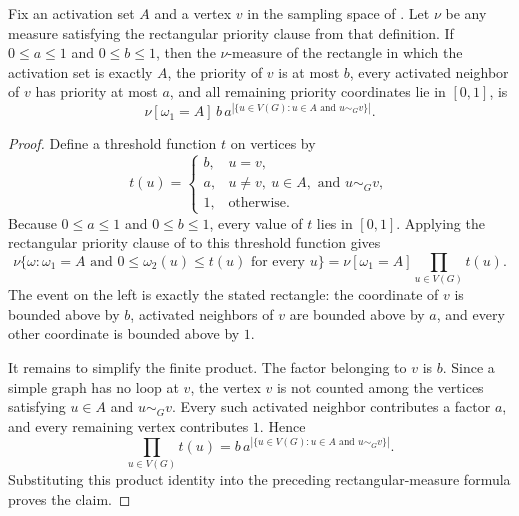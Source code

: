 \begin{helper}
Fix an activation set $A$ and a vertex $v$ in the sampling space of
.  Let $\nu$ be any measure satisfying
the rectangular priority clause from that definition.  If $0\le a\le 1$ and
$0\le b\le 1$, then the $\nu$-measure of the rectangle in which the activation
set is exactly $A$, the priority of $v$ is at most $b$, every activated
neighbor of $v$ has priority at most $a$, and all remaining priority
coordinates lie in $[0,1]$, is
\[
\nu[\omega_1=A]\,
b\,a^{|\{u\in V(G):u\in A\text{ and }u\sim_G v\}|}.
\]
\end{helper}
\begin{proof}
Define a threshold function $t$ on vertices by
\[
t(u)=
\begin{cases}
b, & u=v,\\
a, & u\ne v,\ u\in A,\text{ and }u\sim_G v,\\
1, & \text{otherwise}.
\end{cases}
\]
Because $0\le a\le 1$ and $0\le b\le 1$, every value of $t$ lies in
$[0,1]$.  Applying the rectangular priority clause of
 to this threshold function gives
\[
\nu\{\omega:\omega_1=A\text{ and }0\le \omega_2(u)\le t(u)
\text{ for every }u\}
=
\nu[\omega_1=A]\prod_{u\in V(G)}t(u).
\]
The event on the left is exactly the stated rectangle: the coordinate of
$v$ is bounded above by $b$, activated neighbors of $v$ are bounded above by
$a$, and every other coordinate is bounded above by $1$.

It remains to simplify the finite product.  The factor belonging to $v$ is
$b$.  Since a simple graph has no loop at $v$, the vertex $v$ is not counted
among the vertices satisfying $u\in A$ and $u\sim_G v$.  Every such activated
neighbor contributes a factor $a$, and every remaining vertex contributes
$1$.  Hence
\[
\prod_{u\in V(G)}t(u)
=
b\,a^{|\{u\in V(G):u\in A\text{ and }u\sim_G v\}|}.
\]
Substituting this product identity into the preceding rectangular-measure
formula proves the claim.
\end{proof}
